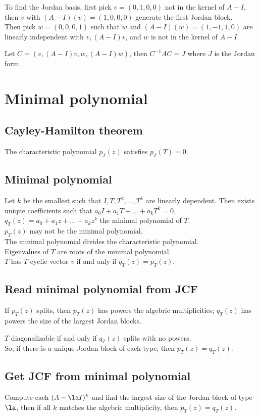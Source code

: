\documentclass[10pt]{LatexTemplate/hw}
\begin{document}
\begin{multicols*}{2}
{    To find the Jordan basis, first pick $v=(0,1,0,0)$ not in the kernel of $A-I$, then $v$ with $(A-I)(v)=(1,0,0,0)$ generate the first Jordan block.\\
    Then pick $w=(0,0,0,1)$ such that $w$ and $(A-I)(w)=(1,-1,1,0)$ are linearly independent with $v, (A-I)v$, and $w$ is not in the kernel of $A-I$.

    Let $C=(v,(A-I)v,w,(A-I)w)$, then $C^{-1}AC=J$ where $J$ is the Jordan form.
}

\section{Minimal polynomial}
\subsection{Cayley-Hamilton theorem}
The characteristic polynomial $p_T(z)$ satisfies $p_T(T)=0$.
\subsection{Minimal polynomial}
Let $k$ be the smallest such that $I,T,T^2,...,T^k$ are linearly dependent. Then exists unique coefficients such that $a_0I+a_1T+...+a_kT^k=0$.\\
$q_T(z)=a_0+a_1z+...+a_kz^k$ the minimal polynomial of $T$.\\
$p_T(z)$ may not be the minimal polynomial.\\
The minimal polynomial divides the characteristic polynomial.\\
Eigenvalues of $T$ are roots of the minimal polynomial.\\
$T$ has $T$-cyclic vector $v$ if and only if $q_T(z)=p_T(z)$.
\subsection{Read minimal polynomial from JCF}
If $p_T(z)$ splits, then $p_T(z)$ has powers the algebric multiplicities; $q_T(z)$ has powers the size of the largest Jordan blocks.

$T$ diagonalizable if and only if $q_T(z)$ splits with no powers.\\
So, if there is a unique Jordan block of each type, then $p_T(z)=q_T(z)$.
\subsection{Get JCF from minimal polynomial}
Compute each $(A-\la I)^k$ and find the largest size of the Jordan block of type $\la$, then if all $k$ matches the algebric multiplicity, then $p_T(z)=q_T(z)$.

\end{multicols*}
\end{document}
